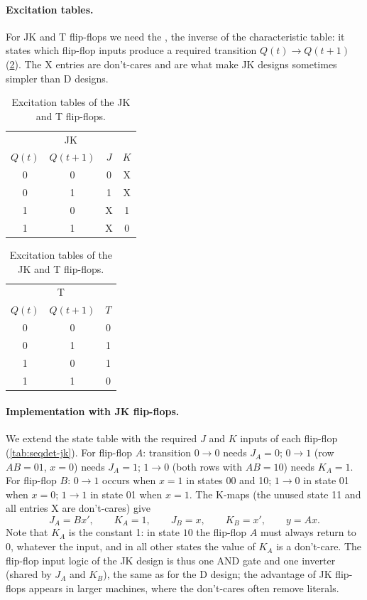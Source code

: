 
\paragraph{Excitation tables.} For JK and T flip-flops we need the , the inverse of the characteristic table: it states which flip-flop inputs produce a required transition $Q(t)\to Q(t+1)$ (\cref{tab:excit}). The X entries are don't-cares and are what make JK designs sometimes simpler than D designs.

\begin{table}[htbp]
\centering
\caption{Excitation tables of the JK and T flip-flops.}
\label{tab:excit}
\begin{tabular}{cc|cc}
\toprule \multicolumn{4}{c}{JK}\\ $Q(t)$&$Q(t{+}1)$&$J$&$K$\\ \midrule
0&0&0&X\\0&1&1&X\\1&0&X&1\\1&1&X&0\\ \bottomrule
\end{tabular}\qquad\qquad
\begin{tabular}{cc|c}
\toprule \multicolumn{3}{c}{T}\\ $Q(t)$&$Q(t{+}1)$&$T$\\ \midrule
0&0&0\\0&1&1\\1&0&1\\1&1&0\\ \bottomrule
\end{tabular}
\end{table}

\paragraph{Implementation with JK flip-flops.} We extend the state table with the required $J$ and $K$ inputs of each flip-flop (\cref{tab:seqdet-jk}). For flip-flop $A$: transition $0\to0$ needs $J_A=0$; $0\to1$ (row $AB=01$, $x=0$) needs $J_A=1$; $1\to0$ (both rows with $AB=10$) needs $K_A=1$. For flip-flop $B$: $0\to1$ occurs when $x=1$ in states 00 and 10; $1\to0$ in state 01 when $x=0$; $1\to1$ in state 01 when $x=1$. The K-maps (the unused state 11 and all entries X are don't-cares) give
\[
 J_A = Bx',\qquad K_A = 1,\qquad J_B = x,\qquad K_B = x',\qquad y = Ax .
\]
Note that $K_A$ is the constant 1: in state $10$ the flip-flop $A$ must always return to 0, whatever the input, and in all other states the value of $K_A$ is a don't-care. The flip-flop input logic of the JK design is thus one AND gate and one inverter (shared by $J_A$ and $K_B$), the same as for the D design; the advantage of JK flip-flops appears in larger machines, where the don't-cares often remove literals.


